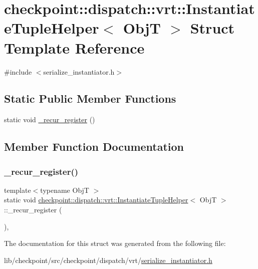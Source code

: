 \hypertarget{structcheckpoint_1_1dispatch_1_1vrt_1_1_instantiate_tuple_helper_3_01_obj_t_01_4}{}\section{checkpoint\+:\+:dispatch\+:\+:vrt\+:\+:Instantiate\+Tuple\+Helper$<$ ObjT $>$ Struct Template Reference}
\label{structcheckpoint_1_1dispatch_1_1vrt_1_1_instantiate_tuple_helper_3_01_obj_t_01_4}


{\ttfamily \#include $<$serialize\+\_\+instantiator.\+h$>$}

\subsection*{Static Public Member Functions}
\begin{DoxyCompactItemize}
\item 
static void \hyperlink{structcheckpoint_1_1dispatch_1_1vrt_1_1_instantiate_tuple_helper_3_01_obj_t_01_4_a4f5e6d64d93da6e3e20ddd5ac288787a}{\+\_\+recur\+\_\+register} ()
\end{DoxyCompactItemize}


\subsection{Member Function Documentation}
\mbox{\label{structcheckpoint_1_1dispatch_1_1vrt_1_1_instantiate_tuple_helper_3_01_obj_t_01_4_a4f5e6d64d93da6e3e20ddd5ac288787a}} 
\subsubsection{\texorpdfstring{\+\_\+recur\+\_\+register()}{\_recur\_register()}}
{\footnotesize\ttfamily template$<$typename ObjT $>$ \\
static void \hyperlink{structcheckpoint_1_1dispatch_1_1vrt_1_1_instantiate_tuple_helper}{checkpoint\+::dispatch\+::vrt\+::\+Instantiate\+Tuple\+Helper}$<$ ObjT $>$\+::\+\_\+recur\+\_\+register (\begin{DoxyParamCaption}{ }\end{DoxyParamCaption})\hspace{0.3cm}{\ttfamily [inline]}, {\ttfamily [static]}}



The documentation for this struct was generated from the following file\+:\begin{DoxyCompactItemize}
\item 
lib/checkpoint/src/checkpoint/dispatch/vrt/\hyperlink{serialize__instantiator_8h}{serialize\+\_\+instantiator.\+h}\end{DoxyCompactItemize}
